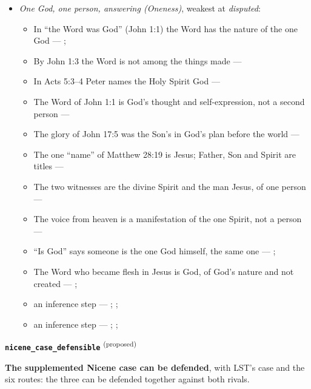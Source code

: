 \documentclass[11pt,paper=\testimonypaper,DIV=13,parskip=false]{scrartcl}
\begin{document}
\begin{itemize}
\begin{itemize}
\end{itemize}
\item \emph{One God, one person, answering (Oneness)}, weakest at \emph{disputed}:
\begin{itemize}
\item In “the Word was God” (John 1:1) the Word has the nature of the one God --- \cite{harner-qualitative-anarthrous-1973}; \cite[3, The Triune God]{kibbey-living-systematic-theology-2026}
\item By John 1:3 the Word is not among the things made --- \cite[Tractates on John I.11]{schaff-nicene-post-nicene-fathers-1-7}
\item In Acts 5:3–4 Peter names the Holy Spirit God --- \cite[198]{calvin-commentary-acts-1844}
\item The Word of John 1:1 is God’s thought and self-expression, not a second person --- \cite[ch. 4 and 8, on John 1:1]{bernard-oneness-of-god-1983}
\item The glory of John 17:5 was the Son’s in God’s plan before the world --- \cite[ch. 8, The Preexistence of Jesus]{bernard-oneness-of-god-1983}
\item The one “name” of Matthew 28:19 is Jesus; Father, Son and Spirit are titles --- \cite[ch. 6, Matthew 28:19]{bernard-oneness-of-god-1983}
\item The two witnesses are the divine Spirit and the man Jesus, of one person --- \cite[ch. 8, Two Witnesses]{bernard-oneness-of-god-1983}
\item The voice from heaven is a manifestation of the one Spirit, not a person --- \cite[ch. 8, The Voice from Heaven]{bernard-oneness-of-god-1983}
\item “Is God” says someone is the one God himself, the same one --- \cite[ch. 8, Are Jesus and the Father One in Purpose Only?]{bernard-oneness-of-god-1983}; \cite[27]{watchtower-should-you-believe-trinity-1989}
\item The Word who became flesh in Jesus is God, of God’s nature and not created --- \cite[3, The Triune God]{kibbey-living-systematic-theology-2026}; \cite[ch. 4, Conclusion]{bernard-oneness-of-god-1983}
\item an inference step --- \cite[3, The Triune God]{kibbey-living-systematic-theology-2026}; \cite[ch. 4, Conclusion]{bernard-oneness-of-god-1983}; \cite[17--19]{buzzard-caveat-lector-2001}
\item an inference step --- \cite[ch. 8, Are Jesus and the Father One in Purpose Only?]{bernard-oneness-of-god-1983}; \cite[27]{watchtower-should-you-believe-trinity-1989}; \cite[I, q. 28, a. 3]{aquinas-summa-1920}
\end{itemize}
\end{itemize}
\par\medskip\noindent\textbf{\texttt{nicene\_\allowbreak{}case\_\allowbreak{}defensible}} \textsuperscript{(proposed)}\par\nobreak\noindent
\textbf{The supplemented Nicene case can be defended}, with LST’s case and the six routes: the three can be defended together against both rivals.
\end{document}
